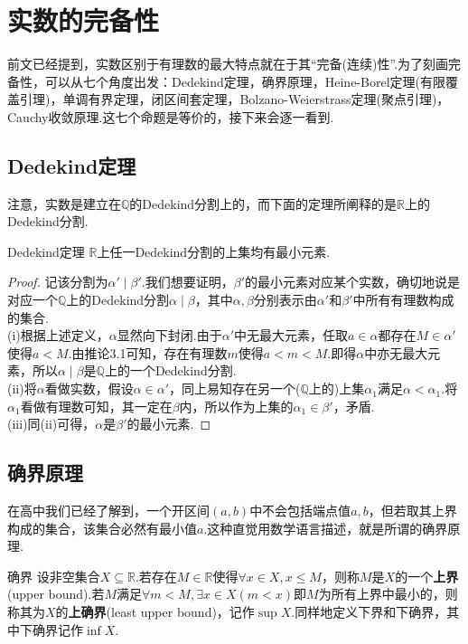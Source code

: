 \documentclass[lang=cn, zihao=5]{elegantbook}
\newcommand{\R}{\mathbb{R}}
\begin{document}
\section{实数的完备性}

前文已经提到，实数区别于有理数的最大特点就在于其“完备(连续)性”.为了刻画完备性，可以从七个角度出发：Dedekind定理，确界原理，Heine-Borel定理(有限覆盖引理)，单调有界定理，闭区间套定理，Bolzano-Weierstrass定理(聚点引理)，Cauchy收敛原理.这七个命题是等价的，接下来会逐一看到.

\subsection{Dedekind定理}

注意，实数是建立在$\mathbb{Q}$的Dedekind分割上的，而下面的定理所阐释的是$\R$上的Dedekind分割.

\begin{theorem}{Dedekind定理}
	$\R$上任一Dedekind分割的上集均有最小元素.
\end{theorem}
\begin{proof}
	记该分割为$\alpha ' \mid \beta '$.我们想要证明，$\beta '$的最小元素对应某个实数，确切地说是对应一个$\mathbb{Q}$上的Dedekind分割$\alpha \mid \beta$，其中$\alpha ,\beta$分别表示由$\alpha '$和$\beta '$中所有有理数构成的集合. \\
	(i)根据上述定义，$\alpha$显然向下封闭.由于$\alpha '$中无最大元素，任取$a \in \alpha$都存在$M \in \alpha '$使得$a < M$.由推论3.1可知，存在有理数$m$使得$a<m<M$.即得$\alpha$中亦无最大元素，所以$\alpha \mid \beta$是$\mathbb{Q}$上的一个Dedekind分割. \\
	(ii)将$\alpha$看做实数，假设$\alpha \in \alpha '$，同上易知存在另一个($\mathbb{Q}$上的)上集$\alpha _1$满足$\alpha < \alpha _1$.将$\alpha _1$看做有理数可知，其一定在$\beta$内，所以作为上集的$\alpha _1 \in \beta '$，矛盾. \\
	(iii)同(ii)可得，$\alpha$是$\beta '$的最小元素.
\end{proof}

\subsection{确界原理}

在高中我们已经了解到，一个开区间$(a,b)$中不会包括端点值$a,b$，但若取其上界构成的集合，该集合必然有最小值$a$.这种直觉用数学语言描述，就是所谓的确界原理.

\begin{definition}{确界}
	设非空集合$X \subseteq \R$.若存在$M \in \R$使得$\forall x \in X,x \leq M$，则称$M$是$X$的一个\textbf{上界}(upper bound).若$M$满足$\forall m<M,\exists x \in X (m<x)$即$M$为所有上界中最小的，则称其为$X$的\textbf{上确界}(least upper bound)，记作$\sup X$.同样地定义下界和下确界，其中下确界记作$\inf X$.
\end{definition}
\end{document}
